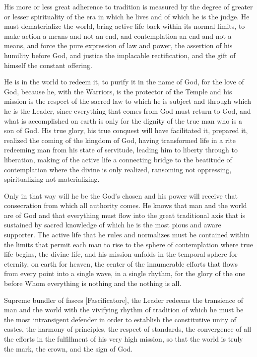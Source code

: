 His more or less great adherence to tradition is measured by the degree of greater or lesser spirituality of the era in which he lives and of which he is the judge. He must dematerialize the world, bring active life back within its normal limits, to make action a means and not an end, and contemplation an end and not a means, and force the pure expression of law and power, the assertion of his humility before God, and justice the implacable rectification, and the gift of himself the constant offering.

He is in the world to redeem it, to purify it in the name of God, for the love of God, because he, with the Warriors, is the protector of the Temple and his mission is the respect of the sacred law to which he is subject and through which he is the Leader, since everything that comes from God must return to God, and what is accomplished on earth is only for the dignity of the true man who is a son of God. His true glory, his true conquest will have facilitated it, prepared it, realized the coming of the kingdom of God, having transformed life in a rite redeeming man from his state of servitude, leading him to liberty through to liberation, making of the active life a connecting bridge to the beatitude of contemplation where the divine is only realized, ransoming not oppressing, spiritualizing not materializing.

Only in that way will he be the God's chosen and his power will receive that consecration from which all authority comes. He knows that man and the world are of God and that everything must flow into the great traditional axis that is sustained by sacred knowledge of which he is the most pious and aware supporter. The active life that he rules and normalizes must be contained within the limits that permit each man to rise to the sphere of contemplation where true life begins, the divine life, and his mission unfolds in the temporal sphere for eternity, on earth for heaven, the center of the innumerable efforts that flows from every point into a single wave, in a single rhythm, for the glory of the one before Whom everything is nothing and the nothing is all.

Supreme bundler of fasces [Fascificatore], the Leader redeems the transience of man and the world with the vivifying rhythm of tradition of which he must be the most intransigent defender in order to establish the constitutive unity of castes, the harmony of principles, the respect of standards, the convergence of all the efforts in the fulfillment of his very high mission, so that the world is truly the mark, the crown, and the sign of God.



